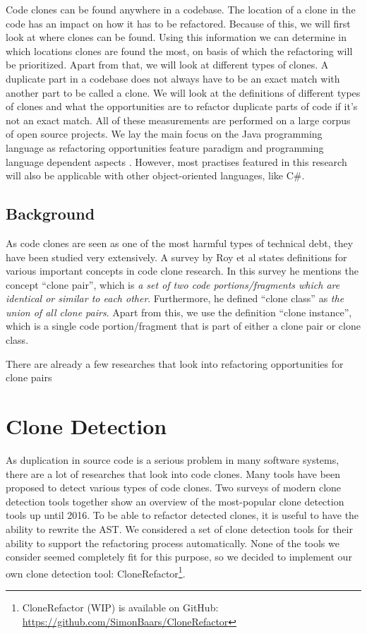 \documentclass[a4paper]{article}
\begin{document}
Code clones can be found anywhere in a codebase. The location of a clone in the code has an impact on how it has to be refactored. Because of this, we will first look at where clones can be found. Using this information we can determine in which locations clones are found the most, on basis of which the refactoring will be prioritized. Apart from that, we will look at different types of clones. A duplicate part in a codebase does not always have to be an exact match with another part to be called a clone. We will look at the definitions of different types of clones and what the opportunities are to refactor duplicate parts of code if it's not an exact match. All of these measurements are performed on a large corpus of open source projects. We lay the main focus on the Java programming language as refactoring opportunities feature paradigm and programming language dependent aspects \cite{choi2011extracting}. However, most practises featured in this research will also be applicable with other object-oriented languages, like C\#.

\subsection{Background}
As code clones are seen as one of the most harmful types of technical debt, they have been studied very extensively. A survey by Roy et al \cite{roy2007survey} states definitions for various important concepts in code clone research. In this survey he mentions the concept ``clone pair'', which is \textit{a set of two code portions/fragments which are identical or similar to each other}. Furthermore, he defined ``clone class'' as \textit{the union of all clone pairs}. Apart from this, we use the definition ``clone instance'', which is a single code portion/fragment that is part of either a clone pair or clone class.

There are already a few researches that look into refactoring opportunities for clone pairs \cite{}

\section{Clone Detection}
As duplication in source code is a serious problem in many software systems, there are a lot of researches that look into code clones. Many tools have been proposed to detect various types of code clones. Two surveys of modern clone detection tools \cite{sheneamer2016survey, svajlenko2014evaluating} together show an overview of the most-popular clone detection tools up until 2016. To be able to refactor detected clones, it is useful to have the ability to rewrite the AST. We considered a set of clone detection tools for their ability to support the refactoring process automatically. None of the tools we consider seemed completely fit for this purpose, so we decided to implement our own clone detection tool: CloneRefactor\footnote{CloneRefactor (WIP) is available on GitHub: \url{https://github.com/SimonBaars/CloneRefactor}}.
\end{document}
